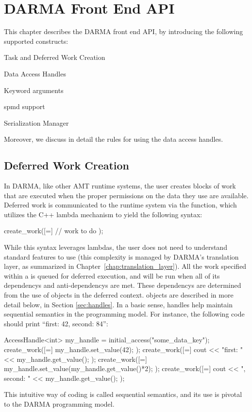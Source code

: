 
\chapter{DARMA Front End API}
\label{chap:front_end}

This chapter describes the DARMA \gls{front end} \gls{API}, 
by introducing the following supported constructs:
\begin{compactitem}
\item Task and Deferred Work Creation
\item Data Access Handles
\item Keyword arguments
\item \gls{spmd} support
\item Serialization Manager
\end{compactitem}
Moreover, we discuss in detail the rules for using the data access handles.


\section{Deferred Work Creation}
\label{sec:deferred}
In DARMA, like other AMT runtime systems, the user creates blocks of work that
are executed when the proper permissions on the data they use are available. 
Deferred work is communicated to the runtime system via the
 function, which utilizes the C++ lambda mechanism to
yield the following syntax:
\begin{CppCode}
  create_work([=]{
    // work to do
  });
\end{CppCode}

While this syntax leverages  lambdas, the user does not need to understand
 standard features to use  (this
complexity is managed by DARMA's translation layer, as summarized in
Chapter~\ref{chap:translation_layer}). All the work specified within a
 is queued for deferred execution, and will be run when
all of its \glspl{dependency} and \glspl{anti-dependency} are met.  
These \glspl{dependency} are determined from the use of 
 objects in the deferred context. 
 objects are described in more detail below, in
Section \ref{sec:handles}.  In a basic sense, handles help maintain
\gls{sequential semantics} in the programming model.  For instance, the
following code should print ``first: 42, second: 84'':
\begin{CppCode}
AccessHandle<int> my_handle = initial_access("some_data_key");
create_work([=]{
  my_handle.set_value(42);
});
create_work([=]{
  cout << "first: " << my_handle.get_value();
});
create_work([=]{
  my_handle.set_value(my_handle.get_value()*2);
});
create_work([=]{
  cout << ", second: " << my_handle.get_value();
});
\end{CppCode}
This intuitive way of coding is called \gls{sequential semantics}, 
and its use is pivotal to the DARMA programming model.

